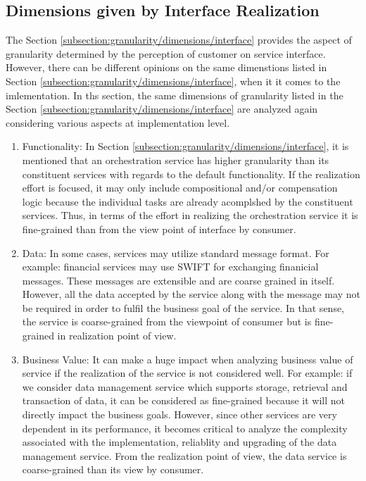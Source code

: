 \subsection{Dimensions given by Interface Realization}\label{subsection:granularity/dimensions/interface_realization}
The Section \ref{subsection:granularity/dimensions/interface} provides the aspect of granularity determined by the perception of customer on service interface. However, there can be different opinions on the same dimenstions listed in Section \ref{subsection:granularity/dimensions/interface}, when it it comes to the imlementation. In ths section, the same dimensions of granularity listed in the Section \ref{subsection:granularity/dimensions/interface} are analyzed again considering various aspects at implementation level.
\begin{enumerate}
\item Functionality: In Section \ref{subsection:granularity/dimensions/interface}, it is mentioned that an orchestration service has higher granularity than its constituent services with regards to the default functionality. If the realization effort is focused, it may only include compositional and/or compensation logic because the individual tasks are already acomplshed by the constituent services. Thus, in terms of the effort in realizing the orchestration service it is fine-grained than from the view point of interface by consumer. \cite{Raf-Haesen:2015aa}
\\
\item Data: In some cases, services may utilize standard message format. For example: financial services may use \acrshort{SWIFT} for exchanging finanicial messages. These messages are extensible and are coarse grained in itself. However, all the data accepted by the service along with the message may not be required in order to fulfil the business goal of the service. In that sense, the service is coarse-grained from the viewpoint of consumer but is fine-grained in realization point of view. \cite{Raf-Haesen:2015aa}
\\
\item Business Value: It can make a huge impact when analyzing business value of service if the realization of the service is not considered well. For example: if we consider data management service which supports storage, retrieval and transaction of data, it can be considered as fine-grained because it will not directly impact the business goals. However, since other services are very dependent in its performance, it becomes critical to analyze the complexity associated with the implementation, reliablity and upgrading of the data management service. From the realization point of view, the data service is coarse-grained than its view by consumer. \cite{Raf-Haesen:2015aa}
\end{enumerate}

